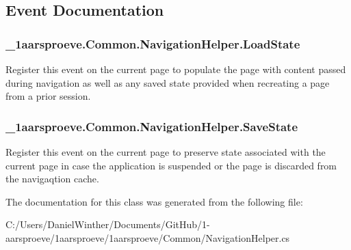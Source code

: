 \subsection{Event Documentation}
\hypertarget{class__1aarsproeve_1_1_common_1_1_navigation_helper_ab4abff9d3eb04794d05d43ff3846e344}{}
\subsubsection[{Load\+State}]{ \+\_\+1aarsproeve.\+Common.\+Navigation\+Helper.\+Load\+State}\label{class__1aarsproeve_1_1_common_1_1_navigation_helper_ab4abff9d3eb04794d05d43ff3846e344}


Register this event on the current page to populate the page with content passed during navigation as well as any saved state provided when recreating a page from a prior session. 

\hypertarget{class__1aarsproeve_1_1_common_1_1_navigation_helper_a627a89278c28e536b6e7fea11da6d465}{}
\subsubsection[{Save\+State}]{ \+\_\+1aarsproeve.\+Common.\+Navigation\+Helper.\+Save\+State}\label{class__1aarsproeve_1_1_common_1_1_navigation_helper_a627a89278c28e536b6e7fea11da6d465}


Register this event on the current page to preserve state associated with the current page in case the application is suspended or the page is discarded from the navigaqtion cache. 



The documentation for this class was generated from the following file\+:\begin{DoxyCompactItemize}
\item 
C\+:/\+Users/\+Daniel\+Winther/\+Documents/\+Git\+Hub/1-\/aarsproeve/1aarsproeve/1aarsproeve/\+Common/Navigation\+Helper.\+cs\end{DoxyCompactItemize}
